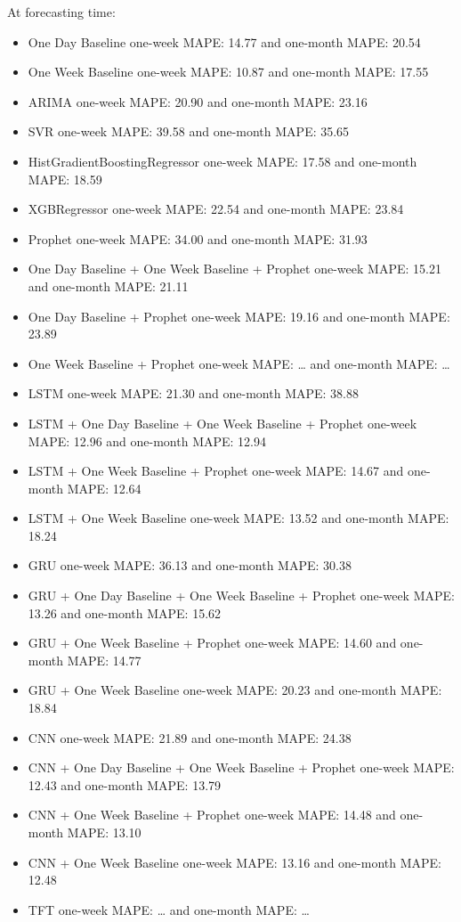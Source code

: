 At forecasting time:
\begin{itemize}
  \item One Day Baseline one-week MAPE: 14.77 and one-month MAPE: 20.54
  \item One Week Baseline one-week MAPE: 10.87 and one-month MAPE: 17.55
  \item ARIMA one-week MAPE: 20.90 and one-month MAPE: 23.16
  \item SVR one-week MAPE: 39.58 and one-month MAPE: 35.65
  \item HistGradientBoostingRegressor one-week MAPE: 17.58 and one-month MAPE: 18.59
  \item XGBRegressor one-week MAPE: 22.54 and one-month MAPE: 23.84
  \item Prophet one-week MAPE: 34.00 and one-month MAPE: 31.93
  \item One Day Baseline + One Week Baseline + Prophet one-week MAPE: 15.21 and one-month MAPE: 21.11
  \item One Day Baseline + Prophet one-week MAPE: 19.16 and one-month MAPE: 23.89
  \item One Week Baseline + Prophet one-week MAPE: … and one-month MAPE: …
  \item LSTM one-week MAPE: 21.30 and one-month MAPE: 38.88
  \item LSTM + One Day Baseline + One Week Baseline + Prophet one-week MAPE: 12.96 and one-month MAPE: 12.94
  \item LSTM + One Week Baseline + Prophet one-week MAPE: 14.67 and one-month MAPE: 12.64
  \item LSTM + One Week Baseline one-week MAPE: 13.52 and one-month MAPE: 18.24
  \item GRU one-week MAPE: 36.13 and one-month MAPE: 30.38
  \item GRU + One Day Baseline + One Week Baseline + Prophet one-week MAPE: 13.26 and one-month MAPE: 15.62
  \item GRU + One Week Baseline + Prophet one-week MAPE: 14.60 and one-month MAPE: 14.77
  \item GRU + One Week Baseline one-week MAPE: 20.23 and one-month MAPE: 18.84
  \item CNN one-week MAPE: 21.89 and one-month MAPE: 24.38
  \item CNN + One Day Baseline + One Week Baseline + Prophet one-week MAPE: 12.43 and one-month MAPE: 13.79
  \item CNN + One Week Baseline + Prophet one-week MAPE: 14.48 and one-month MAPE: 13.10
  \item CNN + One Week Baseline one-week MAPE: 13.16 and one-month MAPE: 12.48
  \item TFT one-week MAPE: … and one-month MAPE: …
\end{itemize}

